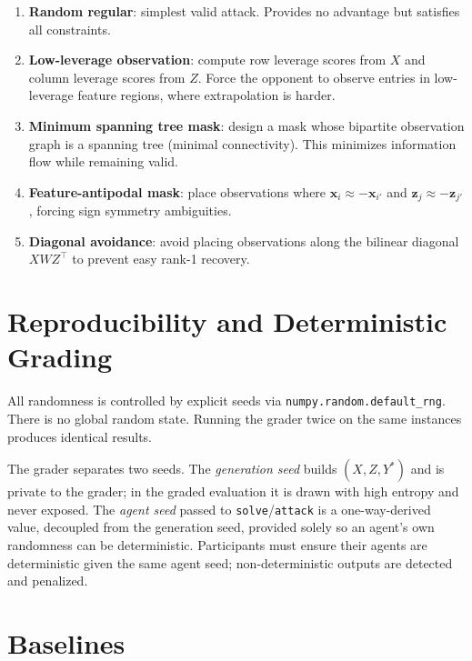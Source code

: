 \documentclass[11pt,a4paper]{article}
\begin{document}
\begin{enumerate}
  \item \textbf{Random regular}: simplest valid attack. Provides no advantage but satisfies all constraints.
  \item \textbf{Low-leverage observation}: compute row leverage scores from $X$
        and column leverage scores from $Z$. Force the opponent to observe entries
        in low-leverage feature regions, where extrapolation is harder.
  \item \textbf{Minimum spanning tree mask}: design a mask whose bipartite observation
        graph is a spanning tree (minimal connectivity). This minimizes information
        flow while remaining valid.
  \item \textbf{Feature-antipodal mask}: place observations where
        $\mathbf{x}_i \approx -\mathbf{x}_{i'}$ and $\mathbf{z}_j \approx -\mathbf{z}_{j'}$,
        forcing sign symmetry ambiguities.
  \item \textbf{Diagonal avoidance}: avoid placing observations along the bilinear diagonal
        $X W Z^\top$ to prevent easy rank-1 recovery.
\end{enumerate}

\section{Reproducibility and Deterministic Grading}

All randomness is controlled by explicit seeds via \texttt{numpy.random.default\_rng}.
There is no global random state. Running the grader twice on the same instances
produces identical results.

The grader separates two seeds. The \emph{generation seed} builds
$(X, Z, Y^*)$ and is private to the grader; in the graded evaluation it is drawn
with high entropy and never exposed. The \emph{agent seed} passed to
\texttt{solve}/\texttt{attack} is a one-way-derived value, decoupled from the
generation seed, provided solely so an agent's own randomness can be
deterministic. Participants must ensure their agents are deterministic given the
same agent seed; non-deterministic outputs are detected and penalized.

\section{Baselines}
\end{document}
